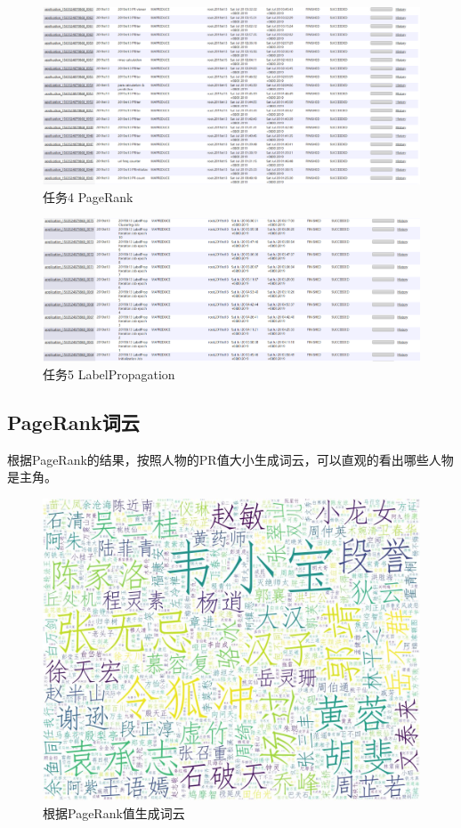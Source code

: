\begin{figure}[htbp]
	\centering
	\includegraphics[scale=0.35]{figures/task4.PNG}
	\caption{任务4 PageRank}
\end{figure}
\begin{figure}[htbp]
	\centering
	\includegraphics[scale=0.35]{figures/task5.PNG}
	\caption{任务5 LabelPropagation}
\end{figure}

\newpage
\newpage
\subsection{PageRank词云}
根据PageRank的结果，按照人物的PR值大小生成词云，可以直观的看出哪些人物是主角。
\begin{figure}[ht]
	\centering
	\includegraphics[scale=0.38]{figures/wordcloud.jpg}
	\caption{根据PageRank值生成词云}
\end{figure}

